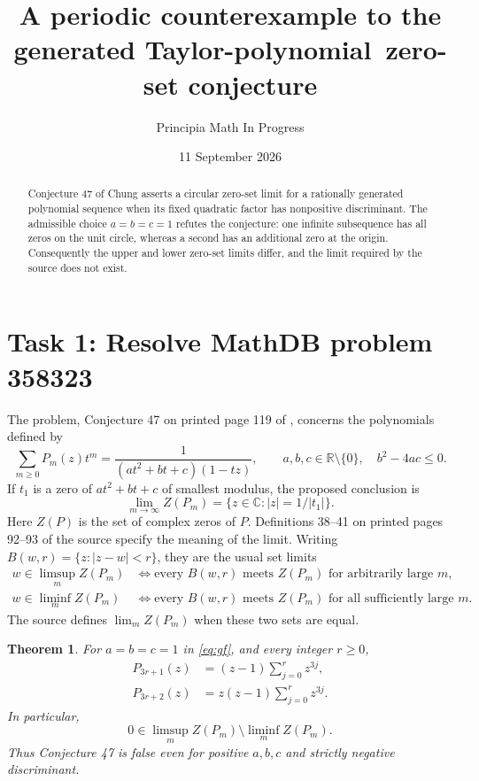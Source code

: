 \documentclass[11pt]{article}
\title{A periodic counterexample to the generated Taylor-polynomial\ zero-set conjecture}
\author{Principia Math In Progress}
\date{11 September 2026}
\newtheorem{theorem}{Theorem}
\newcommand{\C}{\mathbb C}
\begin{document}
\maketitle

\begin{abstract}
Conjecture 47 of Chung asserts a circular zero-set limit for a rationally
generated polynomial sequence when its fixed quadratic factor has nonpositive
discriminant. The admissible choice $a=b=c=1$ refutes the conjecture:
one infinite subsequence has all zeros on the unit circle, whereas a second
has an additional zero at the origin. Consequently the upper and lower
zero-set limits differ, and the limit required by the source does not exist.
\end{abstract}

\section*{Task 1: Resolve MathDB problem 358323}
The problem, Conjecture 47 on printed page 119 of \cite{chung}, concerns
the polynomials defined by
\begin{equation}\label{eq:gf}
 \sum_{m\geq0}P_m(z)t^m=
 \frac{1}{(at^2+bt+c)(1-tz)},\qquad
 a,b,c\in\mathbb R\setminus\{0\},\quad b^2-4ac\leq0.
\end{equation}
If $t_1$ is a zero of $at^2+bt+c$ of smallest modulus, the proposed conclusion is
\[
 \lim_{m\to\infty}Z(P_m)=\{z\in\C:|z|=1/|t_1|\}.
\]
Here $Z(P)$ is the set of complex zeros of $P$. Definitions 38--41 on
printed pages 92--93 of the source specify the meaning of the limit.
Writing $B(w,r)=\{z:|z-w|<r\}$, they are the usual set limits
\begin{align*}
 w\in\limsup_m Z(P_m)
 &\iff \text{every }B(w,r)\text{ meets }Z(P_m)
       \text{ for arbitrarily large }m,\\
 w\in\liminf_m Z(P_m)
 &\iff \text{every }B(w,r)\text{ meets }Z(P_m)
       \text{ for all sufficiently large }m.
\end{align*}
The source defines $\lim_m Z(P_m)$ when these two sets are equal.

\begin{theorem}\label{thm:counterexample}
For $a=b=c=1$ in \eqref{eq:gf}, and every integer $r\geq0$,
\begin{align}
 P_{3r+1}(z)&=(z-1)\sum_{j=0}^{r}z^{3j},\label{eq:first}\\
 P_{3r+2}(z)&=z(z-1)\sum_{j=0}^{r}z^{3j}.
 \label{eq:second}
\end{align}
In particular,
\[
 0\in\limsup_m Z(P_m)\setminus\liminf_m Z(P_m).
\]
Thus Conjecture 47 is false even for positive $a,b,c$ and strictly negative
discriminant.
\end{theorem}
\end{document}

